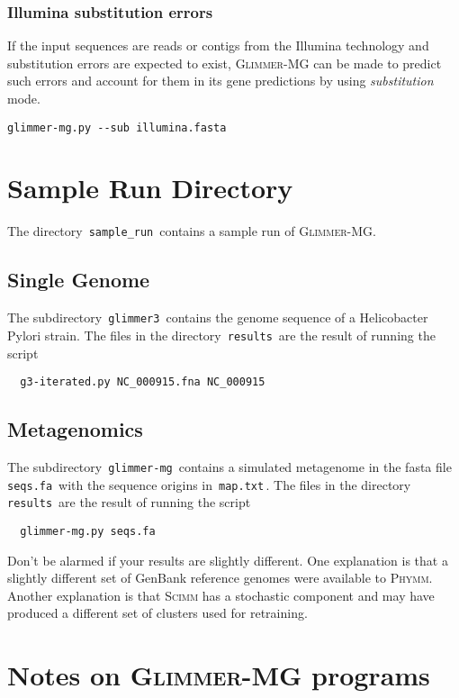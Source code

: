 \documentclass[fleqn,titlepage,11pt]{article}
\def\Gmg{\textsc{Glimmer-MG}}
\def\Phymm{\textsc{Phymm}}
\def\Scimm{\textsc{Scimm}}
\def\Pg#1{\texttt{#1}}
\begin{document}
\subsubsection{Illumina substitution errors}
If the input sequences are reads or contigs from the Illumina
technology and substitution errors are expected to exist, \Gmg{}
can be made to predict such errors and account for them in its gene
predictions by using \emph{substitution} mode.
\BSV
\begin{verbatim}
glimmer-mg.py --sub illumina.fasta
\end{verbatim}
\ESV

\section{Sample Run Directory}
The directory \,\Pg{sample\_run}\, contains a sample run of \Gmg{}.

\subsection{Single Genome}
The subdirectory \,\Pg{glimmer3}\, contains the genome sequence of
a Helicobacter Pylori strain. The files in the directory \,\Pg{results}\, are the
result of running the script
\BSV
\begin{verbatim}
  g3-iterated.py NC_000915.fna NC_000915
\end{verbatim}
\ESV

\subsection{Metagenomics}
The subdirectory \,\Pg{glimmer-mg}\, contains a simulated metagenome
in the fasta file \,\Pg{seqs.fa}\, with the sequence origins in
\,\Pg{map.txt}\,. The files in the directory \,\Pg{results}\, are the
result of running the script
\BSV
\begin{verbatim}
  glimmer-mg.py seqs.fa
\end{verbatim}
\ESV

Don't be alarmed if your results are slightly different. One
explanation is that a slightly different set of GenBank reference
genomes were available to \Phymm. Another explanation is that \Scimm{}
has a stochastic component and may have produced a different set of
clusters used for retraining.

\section{Notes on \Gmg{} programs}
\end{document}
